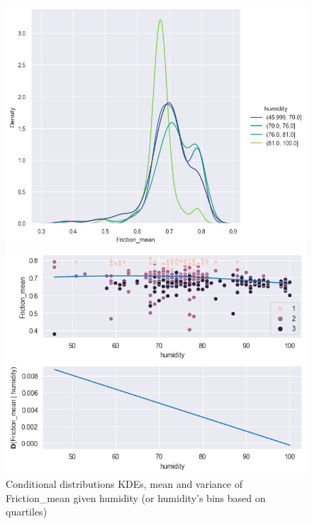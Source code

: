 \documentclass[12pt, bachelor, substylefile = algo_title.rtx]{disser}
\theoremstyle{definition}
\begin{document}
\begin{figure}[!h]
   \begin{minipage}{.48\textwidth}
     \includegraphics[width=\linewidth]{friction_humiditym}
   \end{minipage} \hfill
\begin{minipage}{.48\textwidth}
     \includegraphics[width=\linewidth]{friction_humidityv}
   \end{minipage}
\caption{Conditional distributions KDEs, mean and variance of Friction\_mean given humidity (or humidity's bins based on quartiles)}
\label{fig: 5}
\end{figure}
\end{document}
